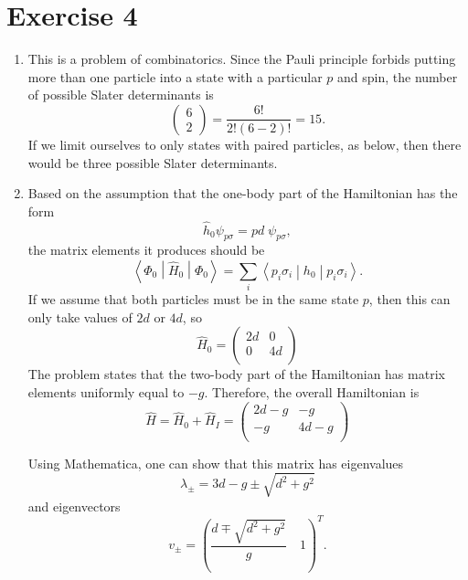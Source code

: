 \documentclass{article}
\newcommand{\mel}[3]{\ensuremath{\left<#1 \middle| #2 \middle| #3 \right>}}
\newcommand{\pmat}[1]{\ensuremath{\begin{pmatrix}#1\end{pmatrix}}}
\begin{document}
\section*{Exercise 4}

	\begin{enumerate}
		\item This is a problem of combinatorics. Since the Pauli principle forbids putting more than one particle into a state with a particular $p$ and spin, the number of possible Slater determinants is
		\begin{equation*}
		 	\pmat{6\\2} = \frac{6!}{2!(6-2)!} = \boxed{15.}
		 \end{equation*} 
		If we limit ourselves to only states with paired particles, as below, then there would be three possible Slater determinants.

		\item Based on the assumption that the one-body part of the Hamiltonian has the form 
		\begin{equation}
			\hat h_0 \psi_{p\sigma} = pd \; \psi_{p\sigma},
		\end{equation}
		the matrix elements it produces should be
		\begin{equation}
			\mel{\Phi_0}{\hat H_0}{\Phi_0} = \sum_i \mel{p_i \sigma_i}{h_0}{p_i \sigma_i}.
		\end{equation}
		If we assume that both particles must be in the same state $p$, then this can only take values of $2d$ or $4d$, so
		\begin{equation}
			\hat H_0 = \begin{pmatrix}
				2d & 0  \\
				0  & 4d \\
			\end{pmatrix}
		\end{equation}
		The problem states that the two-body part of the Hamiltonian has matrix elements uniformly equal to $-g$. Therefore, the overall Hamiltonian is
		\begin{equation}
			\hat H = \hat H_0 + \hat H_I = \boxed{\begin{pmatrix}2d-g & -g  \\ -g  & 4d-g \\ \end{pmatrix}}
		\end{equation}

		Using Mathematica, one can show that this matrix has eigenvalues
		\begin{equation}
			\lambda_\pm = 3d - g \pm \sqrt{d^2 + g^2}
		\end{equation}
		and eigenvectors
		\begin{equation}
			v_{\pm} = \left( \frac{d \mp \sqrt{d^2 + g^2}}{g} \quad 1 \right)^T.
		\end{equation}


\end{enumerate}
\end{document}
